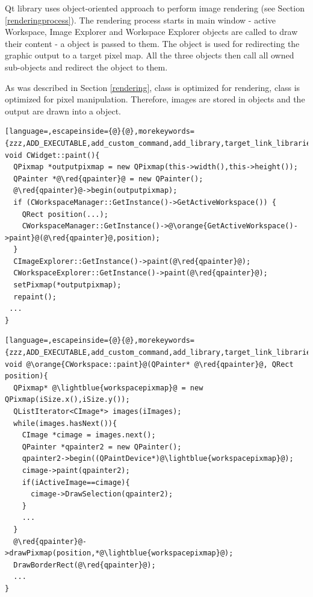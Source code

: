 Qt library uses object-oriented approach to perform image rendering (see Section \ref{renderingprocess}). The rendering process starts in main window - active Workspace, Image Explorer and Workspace Explorer objects are called to draw their content - a  object is passed to them. The  object is used for redirecting the graphic output to a target pixel map. All the three objects then call all owned sub-objects and redirect the  object to them.

As was described in Section \ref{rendering},  class is optimized for rendering,  class is optimized for pixel manipulation. Therefore, images are stored in  objects and the output are drawn into a  object.

\begin{lstlisting}[language=,escapeinside={@}{@},morekeywords={zzz,ADD_EXECUTABLE,add_custom_command,add_library,target_link_libraries,OUTPUT,COMMAND,xxx})]
void CWidget::paint(){
  QPixmap *outputpixmap = new QPixmap(this->width(),this->height());
  QPainter *@\red{qpainter}@ = new QPainter();
  @\red{qpainter}@->begin(outputpixmap);
  if (CWorkspaceManager::GetInstance()->GetActiveWorkspace()) {
    QRect position(...);
    CWorkspaceManager::GetInstance()->@\orange{GetActiveWorkspace()->paint}@(@\red{qpainter}@,position);
  }
  CImageExplorer::GetInstance()->paint(@\red{qpainter}@);
  CWorkspaceExplorer::GetInstance()->paint(@\red{qpainter}@);
  setPixmap(*outputpixmap);
  repaint(); 
 ...
}
\end{lstlisting}

\begin{lstlisting}[language=,escapeinside={@}{@},morekeywords={zzz,ADD_EXECUTABLE,add_custom_command,add_library,target_link_libraries,OUTPUT,COMMAND,xxx})]
void @\orange{CWorkspace::paint}@(QPainter* @\red{qpainter}@, QRect position){
  QPixmap* @\lightblue{workspacepixmap}@ = new QPixmap(iSize.x(),iSize.y());
  QListIterator<CImage*> images(iImages);
  while(images.hasNext()){
    CImage *cimage = images.next();
    QPainter *qpainter2 = new QPainter();
    qpainter2->begin((QPaintDevice*)@\lightblue{workspacepixmap}@);
    cimage->paint(qpainter2);
    if(iActiveImage==cimage){
      cimage->DrawSelection(qpainter2);
    }
    ...
  }
  @\red{qpainter}@->drawPixmap(position,*@\lightblue{workspacepixmap}@);
  DrawBorderRect(@\red{qpainter}@);
  ...
}
\end{lstlisting}